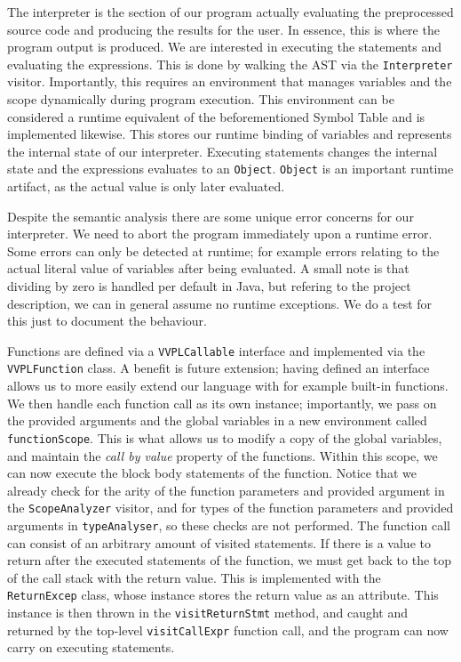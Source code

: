 


The interpreter is the section of our program actually evaluating the preprocessed source code and producing the results for the user.
In essence, this is where the program output is produced. 
We are interested in executing the statements and evaluating the expressions. This is done by walking the AST via the \verb|Interpreter| visitor. 
Importantly, this requires an environment that manages variables and the scope dynamically during program execution. This environment can be considered a runtime equivalent of the beforementioned Symbol Table and is implemented likewise.
This stores our runtime binding of variables and represents the internal state of our interpreter. 
Executing statements changes the internal state and the expressions evaluates to an \verb|Object|.
\verb|Object| is an important runtime artifact, as the actual value is only later evaluated.

Despite the semantic analysis there are some unique error concerns for our interpreter. We need to abort the program immediately upon a runtime error. 
Some errors can only be detected at runtime; for example errors relating to the actual literal value of variables after being evaluated.
A small note is that dividing by zero is handled per default in Java, but refering to the project description, we can in general assume no runtime exceptions. We do a test for this just to document the behaviour. 

Functions are defined via a \verb|VVPLCallable| interface and implemented via the \verb|VVPLFunction| class.
A benefit is future extension; having defined an interface allows us to more easily extend our language with for example built-in functions. 
We then handle each function call as its own instance; importantly, we pass on the provided arguments and the global variables in a new environment called \verb|functionScope|. This is what allows us to modify a copy of the global variables, and maintain the \textit{call by value} property of the functions.
Within this scope, we can now execute the block body statements of the function. Notice that we already check for the arity of the function parameters and provided argument in the \verb|ScopeAnalyzer| visitor, and for types of the function parameters and provided arguments in \verb|typeAnalyser|, so these checks are not performed.
The function call can consist of an arbitrary amount of visited statements.
If there is a value to return after the executed statements of the function, we must get back to the top of the call stack with the return value. 
This is implemented with the \verb|ReturnExcep| class, whose instance stores the return value as an attribute. This instance is then thrown in the \verb|visitReturnStmt| method, and caught and returned by the top-level \verb|visitCallExpr| function call, and the program can now carry on executing statements. 

